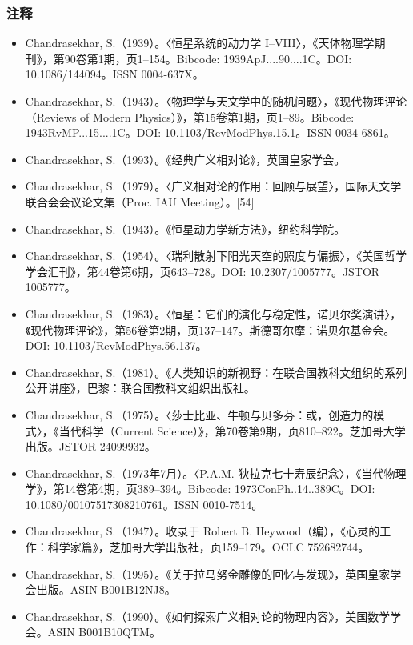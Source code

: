 \subsubsection{注释}
\begin{itemize}
\item Chandrasekhar, S.（1939）。〈恒星系统的动力学 I–VIII〉，《天体物理学期刊》，第90卷第1期，页1–154。Bibcode: 1939ApJ....90....1C。DOI: 10.1086/144094。ISSN 0004-637X。
\item Chandrasekhar, S.（1943）。〈物理学与天文学中的随机问题〉，《现代物理评论（Reviews of Modern Physics）》，第15卷第1期，页1–89。Bibcode: 1943RvMP...15....1C。DOI: 10.1103/RevModPhys.15.1。ISSN 0034-6861。
\item Chandrasekhar, S.（1993）。《经典广义相对论》，英国皇家学会。
\item Chandrasekhar, S.（1979）。〈广义相对论的作用：回顾与展望〉，国际天文学联合会会议论文集（Proc. IAU Meeting）。[54]
\item Chandrasekhar, S.（1943）。《恒星动力学新方法》，纽约科学院。
\item Chandrasekhar, S.（1954）。〈瑞利散射下阳光天空的照度与偏振〉，《美国哲学学会汇刊》，第44卷第6期，页643–728。DOI: 10.2307/1005777。JSTOR 1005777。
\item Chandrasekhar, S.（1983）。〈恒星：它们的演化与稳定性，诺贝尔奖演讲〉，《现代物理评论》，第56卷第2期，页137–147。斯德哥尔摩：诺贝尔基金会。DOI: 10.1103/RevModPhys.56.137。
\item Chandrasekhar, S.（1981）。《人类知识的新视野：在联合国教科文组织的系列公开讲座》，巴黎：联合国教科文组织出版社。
\item Chandrasekhar, S.（1975）。〈莎士比亚、牛顿与贝多芬：或，创造力的模式〉，《当代科学（Current Science）》，第70卷第9期，页810–822。芝加哥大学出版。JSTOR 24099932。
\item Chandrasekhar, S.（1973年7月）。〈P.A.M. 狄拉克七十寿辰纪念〉，《当代物理学》，第14卷第4期，页389–394。Bibcode: 1973ConPh..14..389C。DOI: 10.1080/00107517308210761。ISSN 0010-7514。
\item Chandrasekhar, S.（1947）。收录于 Robert B. Heywood（编），《心灵的工作：科学家篇》，芝加哥大学出版社，页159–179。OCLC 752682744。
\item Chandrasekhar, S.（1995）。《关于拉马努金雕像的回忆与发现》，英国皇家学会出版。ASIN B001B12NJ8。
\item Chandrasekhar, S.（1990）。《如何探索广义相对论的物理内容》，美国数学学会。ASIN B001B10QTM。
\end{itemize}
